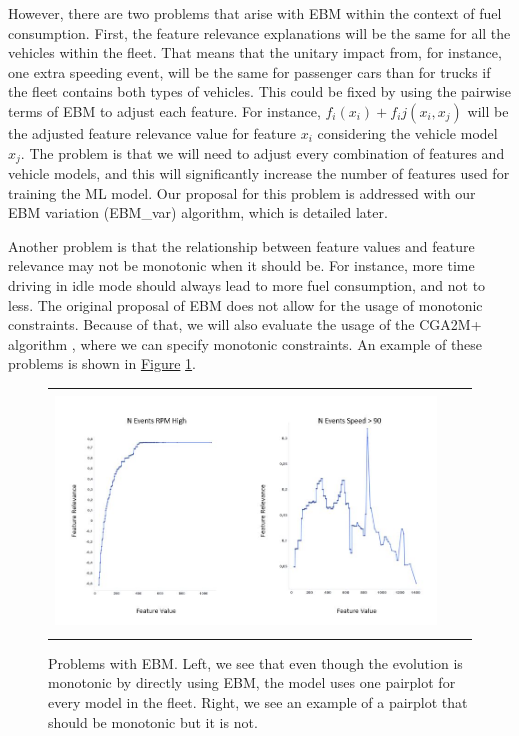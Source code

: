However, there are two problems that arise with EBM within the context of fuel consumption. First, the feature relevance explanations will be the same for all the vehicles within the fleet. That means that the unitary impact from, for instance, one extra speeding event, will be the same for passenger cars than for trucks if the fleet contains both types of vehicles. This could be fixed by using the pairwise terms of EBM to adjust each feature. For instance, $f_i(x_i) + f_ij(x_i, x_j)$ will be the adjusted feature relevance value for feature $x_i$ considering the vehicle model $x_j$. The problem is that we will need to adjust every combination of features and vehicle models, and this will significantly increase the number of features used for training the ML model. Our proposal for this problem is addressed with our EBM variation (EBM\_var) algorithm, which is detailed later.

Another problem is that the relationship between feature values and feature relevance may not be monotonic when it should be. For instance, more time driving in idle mode should always lead to more fuel consumption, and not to less. The original proposal of EBM does not allow for the usage of monotonic constraints. Because of that, we will also evaluate the usage of the CGA2M+ algorithm \parencite{watanabe2021cga2mplus}, where we can specify monotonic constraints. An example of these problems is shown in \hyperref[fig:ch6-ProblemsEBM]{Figure} \ref{fig:ch6-ProblemsEBM}.

\begin{figure}[h!]
\centering
  \begin{tabular}{c@{\qquad}c@{\qquad}c}
  \includegraphics[width=300pt, height=180pt]{figures/chapter6_LucaFleet/ProblemsEBM.jpg}
  \end{tabular} 
  \caption{Problems with EBM. Left, we see that even though the evolution is monotonic by directly using EBM, the model uses one pairplot for every model in the fleet. Right, we see an example of a pairplot that should be monotonic but it is not.}
  \label{fig:ch6-ProblemsEBM}
\end{figure}

